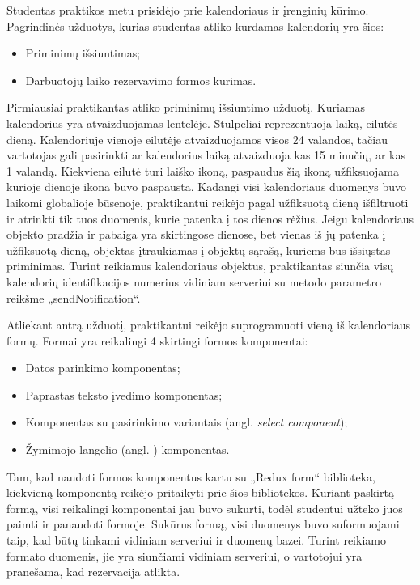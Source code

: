 \documentclass{VUMIFPSbakalaurinis}
\begin{document}
Studentas praktikos metu prisidėjo prie kalendoriaus ir įrenginių kūrimo. Pagrindinės užduotys, kurias studentas atliko kurdamas kalendorių yra šios: 
\begin{itemize}
    \item Priminimų išsiuntimas;
    \item Darbuotojų laiko rezervavimo formos kūrimas.
\end{itemize}

Pirmiausiai praktikantas atliko priminimų išsiuntimo užduotį. Kuriamas kalendorius yra atvaizduojamas lentelėje. Stulpeliai reprezentuoja laiką, eilutės - dieną. Kalendoriuje vienoje eilutėje atvaizduojamos visos 24 valandos, tačiau vartotojas gali pasirinkti ar kalendorius laiką atvaizduoja kas 15 minučių, ar kas 1 valandą. Kiekviena eilutė turi laiško ikoną, paspaudus šią ikoną užfiksuojama kurioje dienoje ikona buvo paspausta. Kadangi visi kalendoriaus duomenys buvo laikomi globalioje būsenoje, praktikantui reikėjo pagal užfiksuotą dieną išfiltruoti ir atrinkti tik tuos duomenis, kurie patenka į tos dienos rėžius. Jeigu kalendoriaus objekto pradžia ir pabaiga yra skirtingose dienose, bet vienas iš jų patenka į užfiksuotą dieną, objektas įtraukiamas į objektų sąrašą, kuriems bus išsiųstas priminimas. Turint reikiamus kalendoriaus objektus, praktikantas siunčia visų kalendorių identifikacijos numerius vidiniam serveriui su metodo parametro reikšme „sendNotification“.

Atliekant antrą užduotį, praktikantui reikėjo suprogramuoti vieną iš kalendoriaus formų. Formai yra reikalingi 4 skirtingi formos komponentai:
\begin{itemize}
    \item Datos parinkimo komponentas;
    \item Paprastas teksto įvedimo komponentas;
    \item Komponentas su pasirinkimo variantais (angl. \textit{select component});
    \item Žymimojo langelio (angl. ) komponentas.
\end{itemize} 
Tam, kad naudoti formos komponentus kartu su „Redux form“ biblioteka, kiekvieną komponentą reikėjo pritaikyti prie šios bibliotekos. Kuriant paskirtą formą, visi reikalingi komponentai jau buvo sukurti, todėl studentui užteko juos paimti ir panaudoti formoje. Sukūrus formą, visi duomenys buvo suformuojami taip, kad būtų tinkami vidiniam serveriui ir duomenų bazei. Turint reikiamo formato duomenis, jie yra siunčiami vidiniam serveriui, o vartotojui yra pranešama, kad rezervacija atlikta.
\end{document}
